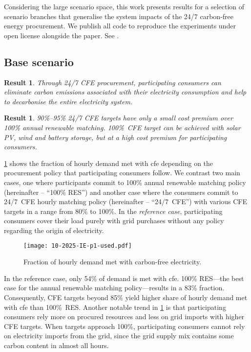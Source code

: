 \documentclass[11pt, 5p, nopreprintline]{elsarticle}
\newtheorem{res}[thm]{Result}  %
\begin{document}
Considering the large scenario space, this work presents results for a selection of scenario branches that generalise the system impacts of the 24/7 carbon-free energy procurement.
We publish all code to reproduce the experiments under open license alongside the paper.
See .

\subsection{Base scenario}
\label{subsec:base}

\begin{res}
    Through 24/7 CFE procurement, participating consumers can eliminate carbon emissions associated with their electricity consumption and help to decarbonise the entire electricity system.
\end{res}

\begin{res}
    90\%--95\% 24/7 CFE targets have only a small cost premium over 100\% annual renewable matching. 100\%~CFE target can be achieved with solar PV, wind and battery storage, but at a high cost premium for participating consumers.
\end{res}

\cref{fig:10-2025-IE-p1-used} shows the fraction of hourly demand met with \gls{cfe} depending on the procurement policy that participating consumers follow.
We contrast two main cases, one where participants commit to 100\% annual renewable matching policy (hereinafter -- \enquote{100\% RES}) and another case where the consumers commit to 24/7~CFE hourly matching policy (hereinafter -- \enquote{24/7~CFE}) with various CFE targets in a range from 80\% to 100\%.
In the \textit{reference case}, participating consumers cover their load purely with grid purchases without any policy regarding the origin of electricity.

\begin{figure}
    \centering
    \texttt{[image: 10-2025-IE-p1-used.pdf]}
    \caption{Fraction of hourly demand met with carbon-free electricity.}
    \label{fig:10-2025-IE-p1-used}
\end{figure}

In the reference case, only 54\% of demand is met with \gls{cfe}.
100\% RES---the best case for the annual renewable matching policy---results in a 83\% fraction.
Consequently, CFE targets beyond 85\% yield higher share of hourly demand met with \gls{cfe} than 100\%~RES.
Another notable trend in \cref{fig:10-2025-IE-p1-used} is that participating consumers rely more on procured resources and less on grid imports with higher CFE targets.
When targets approach 100\%, participating consumers cannot rely on electricity imports from the grid, since the grid supply mix contains some carbon content in almost all hours.
\end{document}
